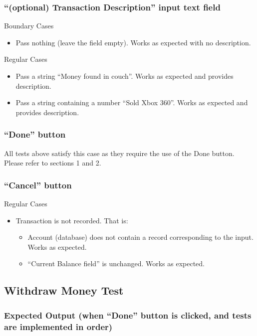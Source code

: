 \documentclass[12pt]{article}
\begin{document}
\subsubsection{“(optional) Transaction Description” input text field}

Boundary Cases
\begin{itemize}
  \item Pass nothing (leave the field empty). Works as expected with no description.
\end{itemize}

Regular Cases
\begin{itemize}
  \item Pass a string “Money found in couch”. Works as expected and provides description.
  \item Pass a string containing a number “Sold Xbox 360”. Works as expected and provides description.
\end{itemize}

\subsubsection{“Done” button}

All tests above satisfy this case as they require the use of the Done button. Please refer to sections 1 and 2.
	
\subsubsection{“Cancel” button}

Regular Cases
\begin{itemize}
  \item Transaction is not recorded. That is:
  \begin{itemize}
    \item Account (database) does not contain a record corresponding to the input. Works as expected.
    \item “Current Balance field” is unchanged. Works as expected.
  \end{itemize}
\end{itemize}

\subsection{Withdraw Money Test}

\subsubsection{Expected Output (when “Done” button is clicked, and tests are implemented in order)}
\end{document}

